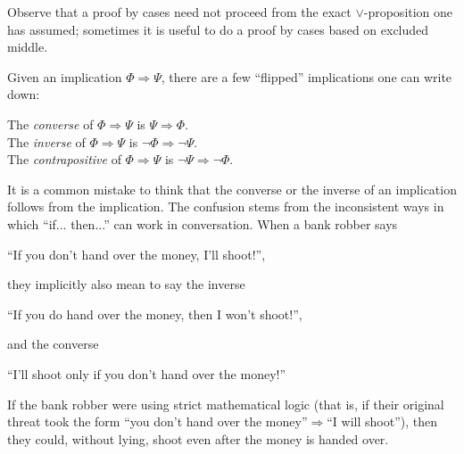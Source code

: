 \documentclass[12pt]{article}
\newcommand{\AND}{\wedge}
\newcommand{\OR}{\vee}
\newcommand{\ARR}{\Rightarrow}
\newcommand{\DARR}{\Leftrightarrow}
\newcounter{exercise}[subsubsection]
\newcounter{rule}
\def\putExerciseHeading{\refstepcounter{exercise} \textbf{Exercise \thesubsubsection.\theexercise}}
\def\putRuleNumber{\refstepcounter{rule}\therule}
\newcommand{\indented}[1]{\begin{adjustwidth}{1em}{}#1\end{adjustwidth}}
\newcommand{\DRULEPF}[3]{\begin{tcolorbox}[title=Derived Rule \putRuleNumber: #1,colbacktitle=white,coltitle=black,colback=white] {#2} \tcblower \textbf{Proof:} {#3} \end{tcolorbox}}
\newcommand{\DRULEPZ}[2]{\begin{tcolorbox}[title=Derived Rule \putRuleNumber: #1,colbacktitle=white,coltitle=black,colback=white] {#2} \tcblower \textbf{Proof:} 
                         \putExerciseHeading. \end{tcolorbox}}
\def\pA{\Phi}
\def\pB{\Psi}
\def\pC{\Omega}
\begin{document}
Observe that a proof by cases need not proceed from the exact $\OR$-proposition one has assumed;
sometimes it is useful to do a proof by cases based on excluded middle.

%
%
%










Given an implication $\pA\ARR\pB$, there are a few ``flipped'' implications one can write down:
\indented{The \emph{converse} of $\pA\ARR\pB$ is $\pB\ARR\pA$.\\
          The \emph{inverse} of $\pA\ARR\pB$ is $\neg\pA\ARR\neg\pB$.\\
          The \emph{contrapositive} of $\pA\ARR\pB$ is $\neg\pB\ARR\neg\pA$.}
It is a common mistake to think that the converse or the inverse of an implication follows from the implication.
The confusion stems from the inconsistent ways in which ``if... then...'' can work in conversation.
When a bank robber says
\begin{center}
``If you don't hand over the money, I'll shoot!'',
\end{center}
they implicitly also mean to say the inverse
\begin{center}
``If you do hand over the money, then I won't shoot!'',
\end{center}
and the converse
\begin{center}
``I'll shoot only if you don't hand over the money!''
\end{center}
If the bank robber were using strict mathematical logic (that is, if their original
threat took the form ``you don't hand over the money''$\ARR$``I will shoot''), then
they could, without lying, shoot even after the money is handed over.
\end{document}
